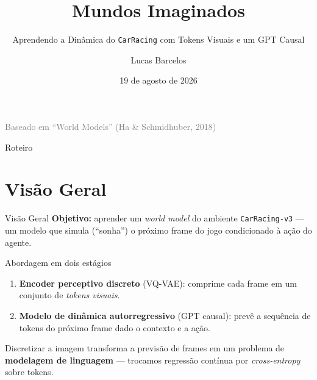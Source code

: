 \documentclass[11pt,aspectratio=169]{beamer}
\title[Mundos Imaginados]{Mundos Imaginados}
\subtitle{Aprendendo a Dinâmica do \texttt{CarRacing} com Tokens Visuais e um GPT Causal}
\author{Lucas Barcelos}
\institute{IMPA Tech / Visgraf}
\date{19 de agosto de 2026}
\begin{document}
\begin{frame}[plain]
  \titlepage
  \begin{center}
    \footnotesize\textcolor{gray}{Baseado em ``World Models'' (Ha \& Schmidhuber, 2018)}
  \end{center}
\end{frame}

\begin{frame}{Roteiro}
  \tableofcontents
\end{frame}

\section{Visão Geral}

\begin{frame}{Visão Geral}
  \textbf{Objetivo:} aprender um \emph{world model} do ambiente
  \texttt{CarRacing-v3} --- um modelo que simula (``sonha'') o próximo frame
  do jogo condicionado à ação do agente.

  \bigskip
  \begin{block}{Abordagem em dois estágios}
    \begin{enumerate}
      \item \textbf{Encoder perceptivo discreto} (VQ-VAE): comprime cada frame
            em um conjunto de \emph{tokens visuais}.
      \item \textbf{Modelo de dinâmica autorregressivo} (GPT causal): prevê a
            sequência de tokens do próximo frame dado o contexto e a ação.
    \end{enumerate}
  \end{block}

  \bigskip
  \small
  Discretizar a imagem transforma a previsão de frames em um problema de
  \textbf{modelagem de linguagem} --- trocamos regressão contínua por
  \emph{cross-entropy} sobre tokens.
\end{frame}
\end{document}
